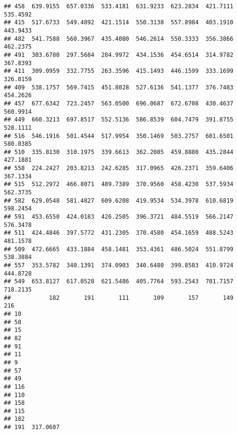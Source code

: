 \documentclass[
]{article}
\begin{document}
\begin{verbatim}
## 458  639.9155  657.0336  533.4181  631.9233  623.2834  421.7111  535.4592
## 415  517.6733  549.4892  421.1514  550.3138  557.8984  403.1910  443.9433
## 482  541.7588  560.3967  435.4080  546.2614  550.3333  356.3866  462.2375
## 491  303.6780  297.5684  284.9972  434.1536  454.6514  314.9782  367.8393
## 411  309.0959  332.7755  263.3596  415.1493  446.1599  333.1699  326.0159
## 409  538.1757  569.7415  451.8028  527.6136  541.1377  376.7483  454.2626
## 457  677.6342  723.2457  563.0500  696.0687  672.6708  430.4637  560.9914
## 449  660.3213  697.8517  552.5136  586.8539  604.7479  391.8755  528.1111
## 516  546.1916  501.4544  517.9954  350.1469  503.2757  601.6501  580.0385
## 510  335.8130  310.1975  339.6613  362.2085  459.8880  435.2844  427.1881
## 558  224.2427  203.8213  242.6285  317.0965  426.2371  359.6406  367.1334
## 515  512.2972  466.8071  489.7389  370.9560  458.4230  537.5934  562.3735
## 582  629.0548  581.4827  609.6208  419.9534  534.3978  610.6819  598.2454
## 591  453.6550  424.0183  426.2505  396.3721  484.5519  566.2147  576.3478
## 511  424.4846  397.5772  431.2305  370.4580  454.1659  488.5243  481.1578
## 509  472.6665  433.1884  458.1481  353.4361  486.5024  551.8799  538.3884
## 557  353.5782  340.1391  374.0903  340.6480  399.8583  410.9724  444.8728
## 549  653.8127  617.0528  621.5486  405.7764  593.2543  701.7157  718.2135
##           182       191       111       109       157       149       216
## 10                                                                       
## 58                                                                       
## 15                                                                       
## 82                                                                       
## 91                                                                       
## 11                                                                       
## 9                                                                        
## 57                                                                       
## 49                                                                       
## 116                                                                      
## 110                                                                      
## 158                                                                      
## 115                                                                      
## 182                                                                      
## 191  317.0607                                                            

\end{verbatim}
\end{document}
